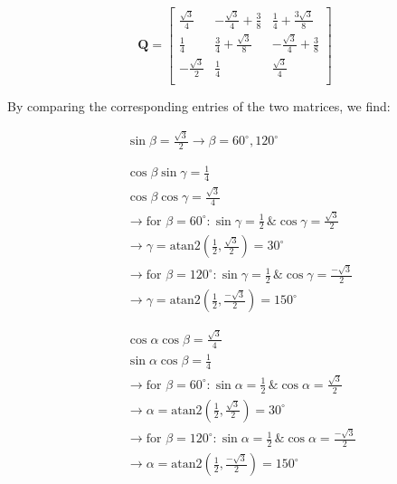 \documentclass[conference]{IEEEtran}
\begin{document}
{\large
$$
\mathbf{Q} = 
\begin{bmatrix}
    \frac{\sqrt{3}}{4} & - \frac{\sqrt{3}}{4} + \frac{3}{8} & \frac{1}{4} + \frac{3\sqrt{3}}{8} \\
    \frac{1}{4} & \frac{3}{4} + \frac{\sqrt{3}}{8} & -\frac{\sqrt{3}}{4} + \frac{3}{8} \\ 
    -\frac{\sqrt{3}}{2} & \frac{1}{4} & \frac{\sqrt{3}}{4} \\
\end{bmatrix}
$$
}

By comparing the corresponding entries of the two matrices, we find:

\begin{align}
    &\sin \beta = \frac{\sqrt{3}}{2} \rightarrow \beta = 60^\circ , 120^\circ \\
    \, \nonumber \\
    \hline
    \, \nonumber \\
    &\cos \beta \sin \gamma = \frac{1}{4} \\
    &\cos \beta \cos \gamma = \frac{\sqrt{3}}{4} \\
    &\rightarrow \text{for } \beta = 60^\circ : \sin \gamma = \frac{1}{2} \, \& \cos \gamma = \frac{\sqrt{3}}{2} \nonumber \\
    &\rightarrow \gamma = \text{atan2}(\frac{1}{2}, \frac{\sqrt{3}}{2}) = 30^\circ \\
    &\rightarrow \text{for } \beta = 120^\circ : \sin \gamma = \frac{1}{2} \, \& \cos \gamma = \frac{-\sqrt{3}}{2} \nonumber \\
    &\rightarrow \gamma = \text{atan2}(\frac{1}{2}, \frac{-\sqrt{3}}{2}) = 150^\circ \\
    \, \nonumber \\
    \hline
    \, \nonumber \\
    &\cos \alpha \cos \beta = \frac{\sqrt{3}}{4} \\
    &\sin \alpha \cos \beta = \frac{1}{4} \\
    &\rightarrow \text{for } \beta = 60^\circ : \sin \alpha = \frac{1}{2} \, \& \cos \alpha = \frac{\sqrt{3}}{2} \nonumber \\
    &\rightarrow \alpha = \text{atan2}(\frac{1}{2}, \frac{\sqrt{3}}{2}) = 30^\circ \\
    &\rightarrow \text{for } \beta = 120^\circ : \sin \alpha = \frac{1}{2} \, \& \cos \alpha = \frac{-\sqrt{3}}{2} \nonumber \\
    &\rightarrow \alpha = \text{atan2}(\frac{1}{2}, \frac{-\sqrt{3}}{2}) = 150^\circ \\
    \, \nonumber \\
    \hline
    \, \nonumber
\end{align}
\end{document}
